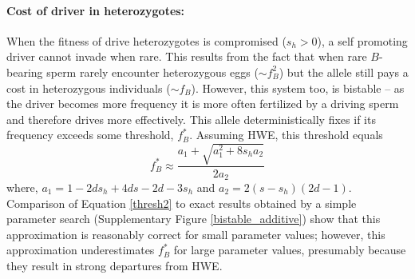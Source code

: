 \documentclass[12pt,letterpaper]{article}
\newcommand{\gc}[1]{{ \color{red} #1}}
\newcommand{\yb}[1]{{ \color{blue} #1}}
\begin{document}
\paragraph{Cost of driver in heterozygotes:} %
When the fitness of drive heterozygotes is compromised ($s_h>0$), a self promoting driver cannot invade when rare.
This results from the fact that
when rare %
$B$-bearing sperm rarely
encounter heterozygous eggs ($\sim f_B^2$) but the allele still pays a
cost in heterozygous individuals ($\sim f_B$). 
However, this system too, is bistable -- as the driver becomes more frequency it is more often fertilized by a driving sperm and therefore drives more effectively.
This allele deterministically fixes if its frequency exceeds some threshold, $f_B^*$.
Assuming HWE, this threshold equals 
\begin{equation}
	f_B^* \approx \frac{a_1+\sqrt{a_1^2+8 s_h a_2}}{2 a_2}
	\label{thresh2}
\end{equation}
where, $a_1=1-2 ds_h+4 d s-2 d-3 s_h$ and $a_2=2(s-s_h)(2d-1)$.
Comparison of Equation \ref{thresh2} to exact results obtained by a
simple parameter search (Supplementary Figure \ref{bistable_additive})
show that this approximation is reasonably correct for small
parameter values; \yb{however, this approximation underestimates $f_B^*$ for large parameter values, presumably because they result in strong departures from HWE.}
\end{document}
